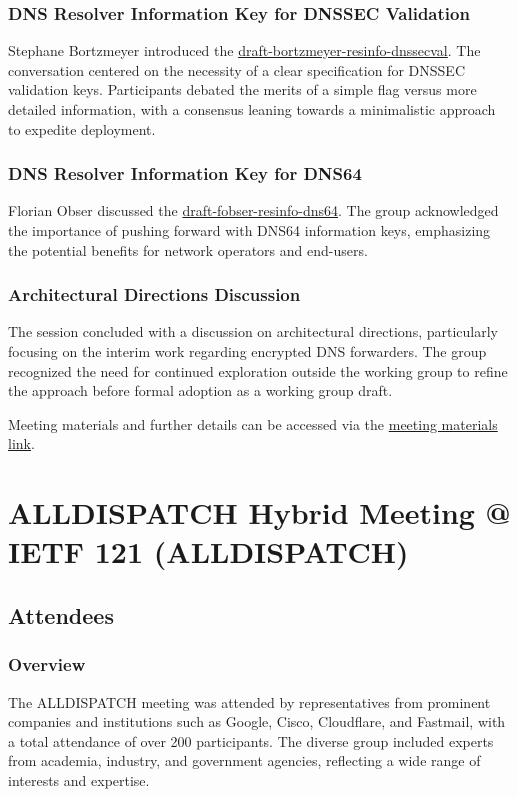 \documentclass{article}
\begin{document}
\subsubsection{DNS Resolver Information Key for DNSSEC Validation}
Stephane Bortzmeyer introduced the \href{https://datatracker.ietf.org/doc/html/draft-bortzmeyer-resinfo-dnssecval}{draft-bortzmeyer-resinfo-dnssecval}. The conversation centered on the necessity of a clear specification for DNSSEC validation keys. Participants debated the merits of a simple flag versus more detailed information, with a consensus leaning towards a minimalistic approach to expedite deployment.

\subsubsection{DNS Resolver Information Key for DNS64}
Florian Obser discussed the \href{https://datatracker.ietf.org/doc/html/draft-fobser-resinfo-dns64}{draft-fobser-resinfo-dns64}. The group acknowledged the importance of pushing forward with DNS64 information keys, emphasizing the potential benefits for network operators and end-users.

\subsubsection{Architectural Directions Discussion}
The session concluded with a discussion on architectural directions, particularly focusing on the interim work regarding encrypted DNS forwarders. The group recognized the need for continued exploration outside the working group to refine the approach before formal adoption as a working group draft.

Meeting materials and further details can be accessed via the \href{https://datatracker.ietf.org/meeting/121/session/add}{meeting materials link}.




\newpage

\section{ALLDISPATCH Hybrid Meeting @ IETF 121 (ALLDISPATCH)}

\subsection{Attendees}
\subsubsection{Overview}
The ALLDISPATCH meeting was attended by representatives from prominent companies and institutions such as Google, Cisco, Cloudflare, and Fastmail, with a total attendance of over 200 participants. The diverse group included experts from academia, industry, and government agencies, reflecting a wide range of interests and expertise.
\end{document}
